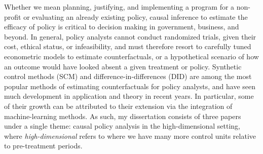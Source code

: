 Whether we mean planning, justifying, and implementing a program for a non-profit or evaluating an already existing policy, causal inference to estimate the efficacy of policy is critical to decision making in government, business, and beyond. In general, policy analysts cannot conduct randomized trials, given their cost, ethical status, or infeasibility, and must therefore resort to carefully tuned econometric models to estimate counterfactuals, or a hypothetical scenario of how an outcome would have looked absent a given treatment or policy. Synthetic control methods (SCM) and difference-in-differences (DID) are among the most popular methods of estimating counterfactuals for policy analysts, and have seen much development in application and theory in recent years. In particular, some of their growth can be attributed to their extension via the integration of machine-learning methods. As such, my dissertation consists of three papers under a single theme: causal policy analysis in the high-dimensional setting, where \emph{high-dimensional} refers to where we have many more control units relative to pre-treatment periods.
